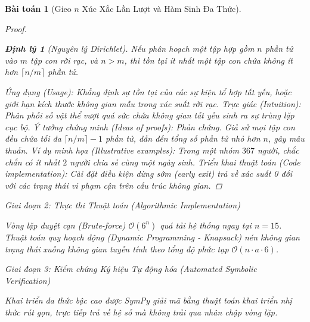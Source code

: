\documentclass{article}
\newtheorem{baitoan}{Bài toán}
\newtheorem{dinhly}{Định lý}
\begin{document}
\begin{baitoan}[Gieo $n$ Xúc Xắc Lần Lượt và Hàm Sinh Đa Thức]
\begin{proof}
\begin{dinhly}[Nguyên lý Dirichlet]
Nếu phân hoạch một tập hợp gồm $n$ phần tử vào $m$ tập con rời rạc, và $n > m$, thì tồn tại ít nhất một tập con chứa không ít hơn $\lceil n/m \rceil$ phần tử.
\end{dinhly}
\emph{Ứng dụng (Usage):} Khẳng định sự tồn tại của các sự kiện tổ hợp tất yếu, hoặc giới hạn kích thước không gian mẫu trong xác suất rời rạc.
\emph{Trực giác (Intuition):} Phân phối số vật thể vượt quá sức chứa không gian tất yếu sinh ra sự trùng lặp cục bộ.
\emph{Ý tưởng chứng minh (Ideas of proofs):} Phản chứng. Giả sử mọi tập con đều chứa tối đa $\lceil n/m \rceil - 1$ phần tử, dẫn đến tổng số phần tử nhỏ hơn $n$, gây mâu thuẫn.
\emph{Ví dụ minh họa (Illustrative examples):} Trong một nhóm $367$ người, chắc chắn có ít nhất $2$ người chia sẻ cùng một ngày sinh.
\emph{Triển khai thuật toán (Code implementation):} Cài đặt điều kiện dừng sớm (early exit) trả về xác suất 0 đối với các trạng thái vi phạm cận trên cấu trúc không gian.
 \end{proof}

\vspace{0.5em}\noindent\emph{Giai đoạn 2: Thực thi Thuật toán (Algorithmic Implementation)}
 
 Vòng lặp duyệt cạn (Brute-force) $\mathcal{O}(6^n)$ quá tải hệ thống ngay tại $n = 15$. Thuật toán quy hoạch động (Dynamic Programming - Knapsack) nén không gian trạng thái xuống không gian tuyến tính theo tổng độ phức tạp $\mathcal{O}(n \cdot a \cdot 6)$.



\vspace{0.5em}\noindent\emph{Giai đoạn 3: Kiểm chứng Ký hiệu Tự động hóa (Automated Symbolic Verification)}
 
 Khai triển đa thức bậc cao được \textsf{SymPy} giải mã bằng thuật toán khai triển nhị thức rút gọn, trực tiếp trả về hệ số mà không trải qua nhân chập vòng lặp.




\end{baitoan}
\end{document}
